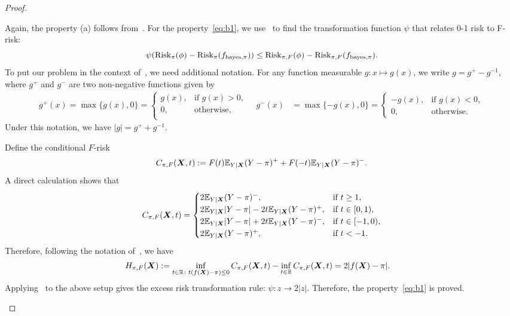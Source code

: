 \documentclass[11pt]{article}
\theoremstyle{plain}
\theoremstyle{definition}
\def\bayespif{f_{\textup{bayes},\pi}}
\def\risk{\textup{Risk}_\pi}
\def\riskF{\textup{Risk}_{\pi,F}}
\begin{document}
\begin{proof}
\begin{enumerate}[label={2.\arabic*},wide, labelwidth=!, labelindent=0pt]
Again, the property (a) follows from~\citet[Lemma 1]{wang2008probability}. For the property~\eqref{eq:b1}, we use~\citet[Theorem 1]{scott2011surrogate} to find the transformation function $\psi$ that relates 0-1 risk to F-risk:
\[
\psi(\risk(\phi)-\risk(\bayespif))\leq \riskF(\phi)-\riskF(\bayespif). 
\]
To put our problem in the context of~\cite{scott2011surrogate}, we need additional notation. For any function measurable $g\colon x\mapsto g(x)$, we write $g=g^{+}-g^{-1}$, where $g^{+}$ and $g^{-}$ are two non-negative functions given by
\begin{align}
g^{+}(x)=\max\{ g(x),0 \} =
\begin{cases}
g(x), & \text{if }g(x)>0,\\
0, & \text{otherwise},\\
\end{cases}\quad 
g^{-}(x)&=\max\{ -g(x),0 \} =
\begin{cases}
-g(x), & \text{if }g(x)<0,\\
0, & \text{otherwise}.
\end{cases}
\end{align}
Under this notation, we have $|g|=g^{+}+g^{-1}$. 

Define the conditional $F$-risk
\[
C_{\pi,F}(\bm X,t):=F(t)\mathbb{E}_{Y|\bm X}(Y-\pi)^{+}+F(-t)\mathbb{E}_{Y|\bm X}(Y-\pi)^{-}.
\]
A direct calculation shows that
\[
C_{\pi,F}(\bm X,t)=
\begin{cases}
2\mathbb{E}_{Y|\bm X}(Y-\pi)^{-}, & \text{if }t\geq 1,\\
2\mathbb{E}_{Y|\bm X}|Y-\pi|-2t\mathbb{E}_{Y|\bm X}(Y-\pi)^{+},  &\text{if }t\in[0,1),\\
2\mathbb{E}_{Y|\bm X}|Y-\pi|+2t\mathbb{E}_{Y|\bm X}(Y-\pi)^{-},  &\text{if }t\in[-1,0),\\
2\mathbb{E}_{Y|\bm X}(Y-\pi)^{+}, & \text{if }t<-1.
\end{cases}
\]
Therefore, following the notation of~\cite{scott2011surrogate}, we have
\begin{align}
H_{\pi,F}(\bm X)&:=\inf_{t\in\mathbb{R}\colon t(f(\bm X)-\pi)\leq 0}C_{\pi,F}(\bm X, t)-\inf_{t\in\mathbb{R}} C_{\pi,F}(\bm X, t) = 2|f(\bm X)-\pi|.
\end{align}
Applying~\citet[Theorem 1]{scott2011surrogate} to the above setup gives the excess risk transformation rule: $\psi: z\to2|z|$. Therefore, the property~\eqref{eq:b1} is proved. 


\end{enumerate}
\end{proof}
\end{document}
